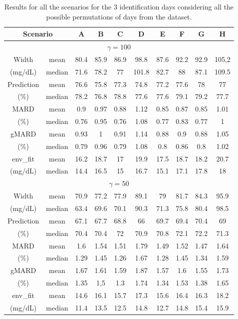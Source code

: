 \begin{table}[hbt]
	\centering
	\begin{tabular}{| c | c | c | c | c | c | c | c | c | c |} 
	\hline
	\multicolumn{2}{|c|}{Scenario} & A & B & C & D & E & F & G & H \\											
	\hline
	\multicolumn{10}{|c|}{$\gamma = 100$} \\
	\hline
 Width & mean &	80.4 & 85.9	& 86.9 & 98.8 & 87.6 & 92.2 & 92.9 & 105,2 \\
 (mg/dL) & median & 71.6 & 78.2 & 77 & 101.8 & 82.7 & 88 & 87.1 & 109.5 \\
\hline
Prediction & mean & 76.6 & 75.8 & 77.3 & 74.8 & 77.2 & 77.6 & 78 & 77 \\
(\%) & median & 78.2 & 76.8 & 78.8 & 77.6 & 77.6 & 79.1 & 79.2 & 77.7 \\
\hline
MARD & mean &	0.9 & 0.97 & 0.88 & 1.12 & 0.85 & 0.87 & 0.85 & 1.01 \\
(\%) & median & 0.76 & 0.95 & 0.76 & 1.08 & 0.77 & 0.83 & 0.77 & 1 \\
\hline
gMARD & mean &	0.93 & 1 & 0.91 & 1.14 & 0.88 & 0.9	& 0.88 & 1.05 \\
(\%)  & median & 0.79 & 0.96 & 0.79 & 1.08 & 0.8 & 0.86 & 0.8 & 1.02 \\
\hline
env\_fit & mean &	16.2 & 18.7 & 17 & 19.9 & 17.5 & 18.7 & 18.2 & 20.7 \\
(mg/dL) & median & 14.4 & 16.5 & 15 & 16.7 & 15.1 & 17.1 & 17.8 & 18 \\
\hline
\multicolumn{10}{|c|}{$\gamma = 50$} \\
\hline
Width & mean & 70.9 & 77.2 & 77.9 & 89.1 & 79 & 81.7 & 84.3 & 95.9 \\
(mg/dL) & median & 63.4	& 69.6 & 70.1 & 90.3 & 71.3 & 75.8 & 80.4 & 98.5 \\
\hline
Prediction & mean & 67.1 & 67.7 & 68.8 & 66 & 69.7 & 69.4 & 70.4 & 69 \\
(\%)  & median & 70.4 & 70.4 & 72 & 70.9 & 70.8 & 72.1 & 72.2 & 71.3 \\
\hline
MARD & mean & 1.6 & 1.54 & 1.51 & 1.79 & 1.49 & 1.52 & 1.47 & 1.64 \\
(\%) & median & 1.29 & 1.45 & 1.26 & 1.67 & 1.28 & 1.45 & 1.34 & 1.59 \\
\hline
gMARD & mean &	1.67 & 1.61 & 1.59 & 1.87 & 1.57 & 1.6 & 1.55 & 1.73 \\
(\%) & median & 1.35 & 1,5 & 1.3 & 1.74 & 1.34 & 1.53 & 1.38 & 1.65 \\
\hline
env\_fit & mean & 14.6 & 16.1 & 15.7 & 17.3 & 15.6 & 16.4 & 16.3 & 18.2 \\
(mg/dL)  & median & 11.4 & 13.5 & 12.5 & 14.8 & 12.7 & 14.8 & 15.4 & 15.9 \\
\hline
	\end{tabular}
\caption{Results for all the scenarios for the 3 identification days considering all the possible permutations of days from the dataset.}
\label{tab:resultsident8scenarios}
\end{table}

